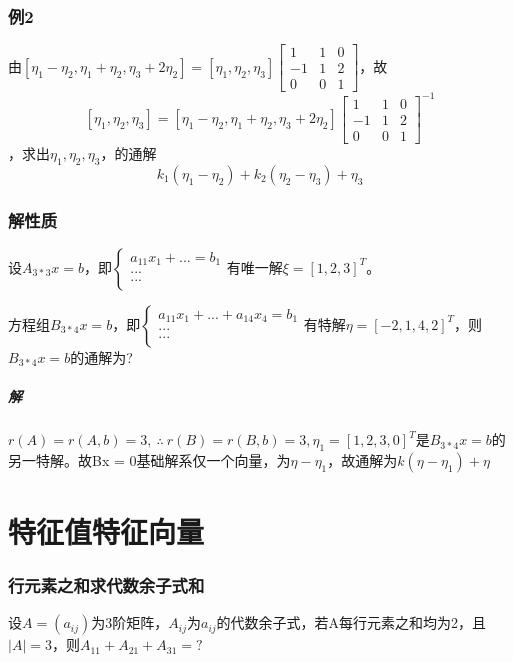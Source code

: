 \subsubsection{例2}
由\([\eta_1 - \eta_2, \eta_1 + \eta_2, \eta_3 + 2\eta_2] = [\eta_1, \eta_2, \eta_3]\begin{bmatrix}
1 & 1 & 0 \\ 
-1 & 1 & 2 \\ 
0 & 0 & 1
\end{bmatrix}\)，故\[[\eta_1, \eta_2, \eta_3] = [\eta_1 - \eta_2, \eta_1 + \eta_2, \eta_3 + 2\eta_2]\begin{bmatrix}
1 & 1 & 0 \\ 
-1 & 1 & 2 \\ 
0 & 0 & 1
\end{bmatrix}^{-1}\]，求出\(\eta_1, \eta_2, \eta_3\)，的通解\[k_1(\eta_1 - \eta_2) + k_2(\eta_2 - \eta_3) + \eta_3\]


\subsubsection{解性质}
设\(A_{3 * 3}x = b\)，即\(\begin{cases}
    a_{11}x_1 + ... = b_1 \\ 
    ... \\ 
    ... \\ 
\end{cases}\)有唯一解\(\xi = [1, 2, 3]^T\)。

方程组\(B_{3 * 4}x = b\)，即\(\begin{cases}
    a_{11}x_1 + ... + a_{14}x_4 = b_1 \\ 
    ... \\ 
    ... \\ 
\end{cases}\)有特解\(\eta = [-2, 1, 4, 2]^T\)，则\(B_{3 * 4}x = b\)的通解为?

\subparagraph{解}
\(r(A) = r(A, b) = 3,\ \therefore\ r(B) = r(B, b) = 3, \eta_1 = [1, 2, 3, 0]^T\)是\(B_{3 * 4}x = b\)的另一特解。故Bx = 0基础解系仅一个向量，为\(\eta - \eta_1\)，故通解为\(k(\eta - \eta_1) + \eta\)


\section{特征值特征向量}

\subsubsection{行元素之和求代数余子式和}
设\(A = (a_{ij})\)为3阶矩阵，\(A_{ij}\)为\(a_{ij}\)的代数余子式，若A每行元素之和均为2，且\(|A| = 3\)，则\(A_{11} + A_{21} + A_{31} = ?\)

